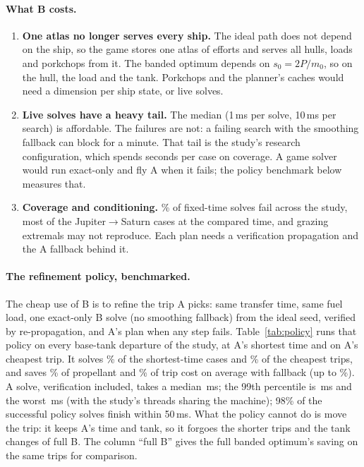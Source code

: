 \documentclass[10pt,a4paper]{article}
\begin{document}
\paragraph{What B costs.}
\begin{enumerate}
\item \textbf{One atlas no longer serves every ship.} The ideal path does not depend on the ship, so the game
  stores one atlas of efforts and serves all hulls, loads and porkchops from it. The banded optimum depends on
  $s_0 = 2P/m_0$, so on the hull, the load and the tank. Porkchops and the planner's caches would need a dimension
  per ship state, or live solves.
\item \textbf{Live solves have a heavy tail.} The median (1\,ms per solve, 10\,ms per search) is affordable. The
  failures are not: a failing search with the smoothing fallback can block for a minute. That tail is the study's
  research configuration, which spends seconds per case on coverage. A game solver would run exact-only and fly A
  when it fails; the policy benchmark below measures that.
\item \textbf{Coverage and conditioning.} \bFailPct\% of fixed-time solves fail across the study, most of the
  Jupiter$\to$Saturn cases at the compared time, and grazing extremals may not reproduce. Each plan needs a
  verification propagation and the A fallback behind it.
\end{enumerate}

\paragraph{The refinement policy, benchmarked.} The cheap use of B is to refine the trip A picks: same transfer
time, same fuel load, one exact-only B solve (no smoothing fallback) from the ideal seed, verified by
re-propagation, and A's plan when any step fails. Table~\ref{tab:policy} runs that policy on every base-tank
departure of the study, at A's shortest time and on A's cheapest trip. It solves \polSolvedPct\% of the shortest-time
cases and \polEconSolvedPct\% of the cheapest trips, and saves \polFuelMean\% of propellant and \polCostMean\% of trip cost on
average with fallback (up to \polCostMax\%). A solve, verification included, takes a median \polMsMedian\,ms; the 99th
percentile is \polMsNinetyNine\,ms and the worst \polMsMax\,ms (with the study's threads sharing the machine); 98\% of the successful policy solves finish within 50\,ms. What the
policy cannot do is move the trip: it keeps A's time and tank, so it forgoes the shorter trips and the tank changes
of full B. The column ``full B'' gives the full banded optimum's saving on the same trips for comparison.
\end{document}
